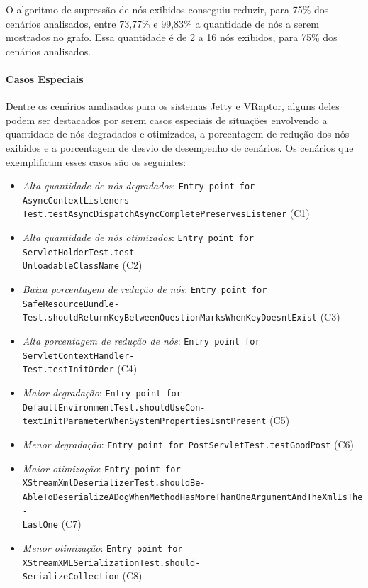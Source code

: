 \begin{framed}
  \noindent O algoritmo de supressão de nós exibidos conseguiu reduzir, para 75\% dos cenários analisados, entre 73,77\% e 99,83\% a quantidade de nós a serem mostrados no grafo. Essa quantidade é de 2 a 16 nós exibidos, para 75\% dos cenários analisados.
\end{framed}

\paragraph{Casos Especiais}

Dentre os cenários analisados para os sistemas Jetty e VRaptor, alguns deles podem ser destacados por serem casos especiais de situações envolvendo a quantidade de nós degradados e otimizados, a porcentagem de redução dos nós exibidos e a porcentagem de desvio de desempenho de cenários. Os cenários que exemplificam esses casos são os seguintes:
\begin{itemize}
  \item \textit{Alta quantidade de nós degradados}: \texttt{Entry point for AsyncContextListeners-\\Test.testAsyncDispatchAsyncCompletePreservesListener} (C1)
  \item \textit{Alta quantidade de nós otimizados}:  \texttt{Entry point for ServletHolderTest.test-\\UnloadableClassName} (C2)
  \item \textit{Baixa porcentagem de redução de nós}: \texttt{Entry point for SafeResourceBundle-\\Test.shouldReturnKeyBetweenQuestionMarksWhenKeyDoesntExist} (C3)
  \item \textit{Alta porcentagem de redução de nós}: \texttt{Entry point for ServletContextHandler-\\Test.testInitOrder} (C4)
  \item \textit{Maior degradação}: \texttt{Entry point for DefaultEnvironmentTest.shouldUseCon-\\textInitParameterWhenSystemPropertiesIsntPresent} (C5)
  \item \textit{Menor degradação}: \texttt{Entry point for PostServletTest.testGoodPost} (C6)
  \item \textit{Maior otimização}: \texttt{Entry point for XStreamXmlDeserializerTest.shouldBe-\\AbleToDeserializeADogWhenMethodHasMoreThanOneArgumentAndTheXmlIsThe-\\LastOne} (C7)
  \item \textit{Menor otimização}: \texttt{Entry point for XStreamXMLSerializationTest.should-\\SerializeCollection} (C8)
\end{itemize}

